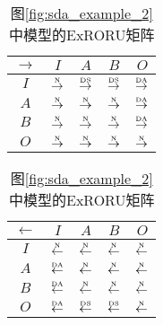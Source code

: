 \begin{table}[htbp]
  \begin{subtable}{1\textwidth}
    \vspace{1em}
    \centering
    \caption{图\ref{fig:sda_example_2}中模型的ExRORU矩阵}
    \label{tab:sda_example_2_matrix}
    \begin{minipage}[b]{0.3\textwidth}
      \centering
      \begin{tabular}{|c|c|c|c|c|} \hline
        $\rightarrow$ & $I$ & $A$ & $B$ & $O$\\ \hline
        $I$ & $\overset{\text{\tiny{N}}}{\rightarrow}$ & $\overset{\text{\tiny{DS}}}{\rightarrow}$ & $\overset{\text{\tiny{DS}}}{\rightarrow}$ & $\overset{\text{\tiny{DA}}}{\rightarrow}$\\ \hline
        $A$ & $\overset{\text{\tiny{N}}}{\rightarrow}$ & $\overset{\text{\tiny{N}}}{\rightarrow}$ & $\overset{\text{\tiny{N}}}{\rightarrow}$ & $\overset{\text{\tiny{DA}}}{\rightarrow}$\\ \hline
        $B$ & $\overset{\text{\tiny{N}}}{\rightarrow}$ & $\overset{\text{\tiny{N}}}{\rightarrow}$ & $\overset{\text{\tiny{N}}}{\rightarrow}$ & $\overset{\text{\tiny{DA}}}{\rightarrow}$\\ \hline
        $O$ & $\overset{\text{\tiny{N}}}{\rightarrow}$ & $\overset{\text{\tiny{N}}}{\rightarrow}$ & $\overset{\text{\tiny{N}}}{\rightarrow}$ & $\overset{\text{\tiny{N}}}{\rightarrow}$\\ \hline
      \end{tabular}
    \end{minipage}
    \begin{minipage}[b]{0.3\textwidth}
      \centering
      \begin{tabular}{|c|c|c|c|c|} \hline
        $\leftarrow$ & $I$ & $A$ & $B$ & $O$\\ \hline
        $I$ & $\overset{\text{\tiny{N}}}{\leftarrow}$ & $\overset{\text{\tiny{N}}}{\leftarrow}$ & $\overset{\text{\tiny{N}}}{\leftarrow}$ & $\overset{\text{\tiny{N}}}{\leftarrow}$\\ \hline
        $A$ & $\overset{\text{\tiny{DA}}}{\leftarrow}$ & $\overset{\text{\tiny{N}}}{\leftarrow}$ & $\overset{\text{\tiny{N}}}{\leftarrow}$ & $\overset{\text{\tiny{N}}}{\leftarrow}$\\ \hline
        $B$ & $\overset{\text{\tiny{DA}}}{\leftarrow}$ & $\overset{\text{\tiny{N}}}{\leftarrow}$ & $\overset{\text{\tiny{N}}}{\leftarrow}$ & $\overset{\text{\tiny{N}}}{\leftarrow}$\\ \hline
        $O$ & $\overset{\text{\tiny{DA}}}{\leftarrow}$ & $\overset{\text{\tiny{DS}}}{\leftarrow}$ & $\overset{\text{\tiny{DS}}}{\leftarrow}$ & $\overset{\text{\tiny{N}}}{\leftarrow}$\\ \hline

\end{tabular}
\end{minipage}
\end{subtable}
\end{table}
